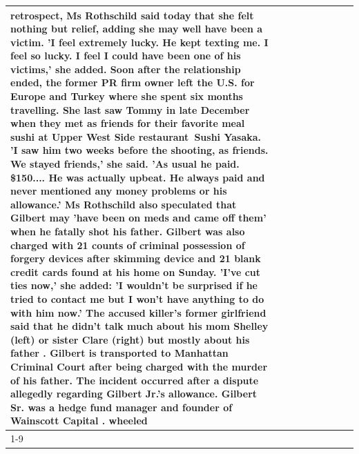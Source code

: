 \begin{table}[H]
\begin{tabular}{lllrlllll}
retrospect, Ms Rothschild said today that she felt nothing but relief, adding she may well have been a victim. 'I feel extremely lucky. He kept texting me. I feel so lucky. I feel I could have been one of his victims,' she added. Soon after the relationship ended, the former PR firm owner left the U.S. for Europe and Turkey where she spent six months  travelling. She last saw Tommy in late December when they met as friends for their favorite meal sushi at Upper West Side restaurant Sushi Yasaka. 'I saw him two weeks before the shooting, as friends. We stayed friends,' she said. 'As usual he paid. \$150.... He was actually upbeat. He always paid and never mentioned any money problems or his allowance.' Ms Rothschild also speculated that Gilbert may 'have been on meds and came off them' when he fatally shot his father. Gilbert was also charged with 21 counts of criminal possession of forgery devices after skimming device and 21 blank credit cards found at his home on Sunday. 'I've cut ties now,' she added: 'I wouldn’t be surprised if he tried to contact me but I won’t have anything to do with him now.' The accused killer's former girlfriend said that he didn't talk much about his mom Shelley (left) or sister Clare (right) but mostly about his father . Gilbert is transported to Manhattan Criminal Court  after being charged with the murder of his father. The incident occurred after a dispute allegedly regarding Gilbert Jr.'s allowance. Gilbert Sr. was a hedge fund manager and founder of Wainscott Capital . wheeled \\
\cline{1-9}

\end{tabular}
\end{table}
